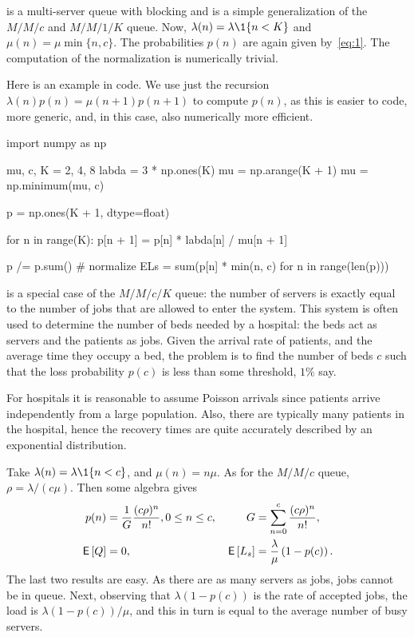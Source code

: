  is a multi-server queue with blocking and is a simple generalization of the $M/M/c$ and $M/M/1/K$ queue.
Now, $\lambda(n) = \lambda\1{n<K}$ and $\mu(n) = \mu \min\{n, c\}$.
The probabilities $p(n)$ are again given by~\cref{eq:1}.
The computation of the normalization is numerically trivial.


Here is an example in code.  We use just the recursion $\lambda(n) p(n) = \mu(n+1)p(n+1)$ to compute $p(n)$, as this is easier to code, more generic, and, in this case, also numerically more efficient.

\begin{pyconsole}
import numpy as np

mu, c, K = 2, 4, 8
labda = 3 * np.ones(K)
mu = np.arange(K + 1)
mu = np.minimum(mu, c)

p = np.ones(K + 1, dtype=float)

for n in range(K):
    p[n + 1] = p[n] * labda[n] / mu[n + 1]

p /= p.sum()  # normalize
ELs = sum(p[n] * min(n, c) for n in range(len(p)))
\end{pyconsole}

 is a special case of the $M/M/c/K$ queue: the number of servers is exactly equal to the number of jobs that are allowed to enter the system. This system is often used to determine the number of beds needed by a hospital: the beds act as servers and the patients as jobs.
Given the arrival rate of patients, and the average time they occupy a bed, the problem is to find the number of beds $c$ such that the loss probability $p(c)$ is less than some threshold, $1\%$ say.

For hospitals it is reasonable to assume  Poisson arrivals since patients arrive independently from a large population.
Also, there are typically many patients in the hospital, hence the recovery times are quite accurately described by an exponential distribution.

Take $\lambda(n) = \lambda\1{n<c}$, and $\mu(n) = n \mu$.
As for the $M/M/c$ queue, $\rho = \lambda/(c \mu)$.
Then some algebra gives
 \begin{align*}
   p(n) &= \frac 1 G \frac{(c\rho)^n}{n!}, 0\leq n \leq c, &
   G&=\sum_{n=0}^{c} \frac{(c\rho)^n}{n!},\\
   \,\mathsf{E}\left[Q\right] &= 0, &
\,\mathsf{E}\left[L_s\right] &= \frac{\lambda}{\mu} \left(1- p(c)\right).
\end{align*}
The last two results are easy.
As there are as many servers as jobs, jobs cannot be in queue.
Next, observing that $\lambda(1-p(c))$ is the rate of accepted jobs, the load is $\lambda(1-p(c))/\mu$, and this in turn is equal to the average number of busy servers.


